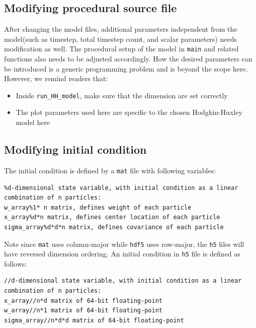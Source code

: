 \documentclass[10pt]{article} %
\begin{document}
\subsection{Modifying procedural source file}
After changing the model files, additional parameters independent from the model(such as timestep, total timestep count, and scalar parameters) needs modification as well. The procedural setup of the model in \texttt{main} and related functions also needs to be adjusted accordingly. How the desired parameters can be introduced is a generic programming problem and is beyond the scope here. However, we remind readers that:
\begin{itemize}
\item
Inside \texttt{run\_HH\_model}, make sure that the dimension are set correctly
\item
The plot parameters used here are specific to the chosen Hodgkin-Huxley model here
\end{itemize}
\subsection{Modifying initial condition}
The initial condition is defined by a \texttt{mat} file with following variables:
\begin{lstlisting}
%d-dimensional state variable, with initial condition as a linear combination of n particles:
w_array%1* n matrix, defines weight of each particle
x_array%d*n matrix, defines center location of each particle
sigma_array%d*d*n matrix, defines covariance of each particle
\end{lstlisting}
Note since \texttt{mat} uses column-major while \texttt{hdf5} uses row-major, the \texttt{h5} files will have reversed dimension ordering. An initial condition in \texttt{h5} file is defined as follows:
\begin{lstlisting}
//d-dimensional state variable, with initial condition as a linear combination of n particles:
x_array//n*d matrix of 64-bit floating-point
w_array//n*1 matrix of 64-bit floating-point
sigma_array//n*d*d matrix of 64-bit floating-point
\end{lstlisting}
\end{document}
